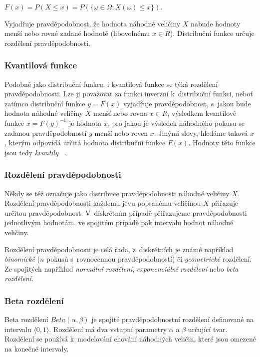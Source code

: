\documentclass[thesis=M,czech]{FITthesis}[2014/05/07]
\begin{document}
\begin{center}
$F(x) = P(X \leq x) = P(\{ \omega \in \Omega: X(\omega) \leq x \})$.
\end{center}

Vyjadřuje pravděpodobnost, že hodnota náhodné veličiny $X$ nabude hodnoty menší nebo rovné zadané hodnotě (libovolnému $x \in R$). Distribuční funkce určuje rozdělení pravděpodobnosti.

\subsubsection{Kvantilová funkce}
\label{icdf}
Podobně jako distribuční funkce, i kvantilová funkce se týká rozdělení pravděpodobnosti. Lze ji považovat za funkci inverzní k~distribuční funkci, neboť zatímco distribuční funkce $y = F(x)$ vyjadřuje pravděpodobnost, s~jakou bude hodnota náhodné veličiny $X$ menší nebo rovna $x \in R$, výsledkem kvantilové funkce $x = F(y)^{-1}$ je hodnota $x$, pro jakou je výsledek náhodného pokusu se zadanou pravděpodobností $y$ menší nebo roven $x$. Jinými slovy, hledáme taková $x$, kterým odpovídá určitá hodnota distribuční funkce $F(x)$. Hodnoty této funkce jsou tedy \emph{kvantily}~\cite{pst2} .

\subsubsection{Rozdělení pravděpodobnosti}
\label{distr}
Někdy se též označuje jako distribuce pravděpodobnosti náhodné veličiny $X$. 
Rozdělení pravděpodobnosti každému jevu popsanému veličinou $X$ přiřazuje určitou pravděpodobnost. V~diskrétním případě přiřazujeme pravděpodobnosti jednotlivým hodnotám, ve spojitém případě pak intervalu hodnot náhodné veličiny. 

Rozdělení pravděpodobnosti je celá řada, z~diskrétních je známé například \emph{binomické} ($n$ pokusů s~rovnocennou pravděpodobností) či \emph{geometrické} rozdělení. Ze spojitých například \emph{normální rozdělení}, \emph{exponenciální rozdělení} nebo \emph{beta rozdělení}.

\subsubsection{Beta rozdělení}
\label{beta}
Beta rozdělení ${Beta}(\alpha, \beta)$ je spojité pravděpodobnostní rozdělení definované na intervalu $\langle0,1\rangle$. Rozdělení má dva vstupní parametry $\alpha$ a $\beta$ určující tvar. Rozdělení se používá k~modelování chování náhodných veličin, které jsou omezené na konečné intervaly. 
\end{document}
